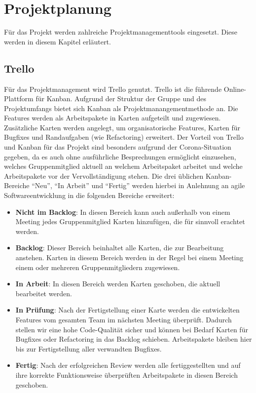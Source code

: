 \section{Projektplanung}
Für das Projekt werden zahlreiche Projektmanagementtools eingesetzt. Diese werden in diesem Kapitel erläutert.
\subsection*{Trello}
Für das Projektmanagement wird Trello genutzt. Trello ist die führende Online-Plattform für Kanban. Aufgrund der Struktur der Gruppe und des Projektumfangs bietet sich Kanban als Projektmanangementmethode an. Die Features werden als Arbeitspakete in Karten aufgeteilt und zugewiesen. Zusätzliche Karten werden angelegt, um organisatorische Features, Karten für Bugfixes und Randaufgaben (wie Refactoring) erweitert.
Der Vorteil von Trello und Kanban für das Projekt sind besonders aufgrund der Corona-Situation gegeben, da es auch ohne ausführliche Besprechungen ermöglicht einzusehen, welches Gruppenmitglied aktuell an welchem Arbeitspaket arbeitet und welche Arbeitspakete vor der Vervollständigung stehen. Die drei üblichen Kanban-Bereiche \enquote{Neu}, \enquote{In Arbeit} und \enquote{Fertig} werden hierbei in Anlehnung an agile Softwareentwicklung in die folgenden Bereiche erweitert:
\begin{itemize}
    \item \textbf{Nicht im Backlog}: In diesen Bereich kann auch außerhalb von einem Meeting jedes Gruppenmitglied Karten hinzufügen, die für sinnvoll erachtet werden.
    \item \textbf{Backlog}: Dieser Bereich beinhaltet alle Karten, die zur Bearbeitung anstehen. Karten in diesem Bereich werden in der Regel bei einem Meeting einem oder mehreren Gruppenmitgliedern zugewiesen.
    \item \textbf{In Arbeit}: In diesen Bereich werden Karten geschoben, die aktuell bearbeitet werden.
    \item \textbf{In Prüfung}: Nach der Fertigstellung einer Karte werden die entwickelten Features vom gesamten Team im nächsten Meeting überprüft. Dadurch stellen wir eine hohe Code-Qualität sicher und können bei Bedarf Karten für Bugfixes oder Refactoring in das Backlog schieben. Arbeitspakete bleiben hier bis zur Fertigstellung aller verwandten Bugfixes.
    \item \textbf{Fertig}: Nach der erfolgreichen Review werden alle fertiggestellten und auf ihre korrekte Funktionsweise überprüften Arbeitspakete in diesen Bereich geschoben.
\end{itemize}
